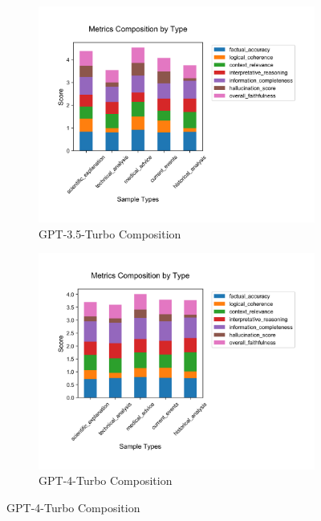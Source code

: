 \begin{figure}[!htbp]
\centering
\begin{subfigure}[b]{0.32\textwidth}
    \includegraphics[width=\textwidth]{figures/visualization/metrics_stacked_bar_gpt-3.5-turbo.png}
    \caption{GPT-3.5-Turbo Composition}
    \label{fig:metrics_stacked_bar_gpt35}
\end{subfigure}
\hfill
\begin{subfigure}[b]{0.32\textwidth}
    \includegraphics[width=\textwidth]{figures/visualization/metrics_stacked_bar_gpt-4-turbo.png}
    \caption{GPT-4-Turbo Composition}
    \label{fig:metrics_stacked_bar_gpt4t}
\end{subfigure}

\end{figure}
